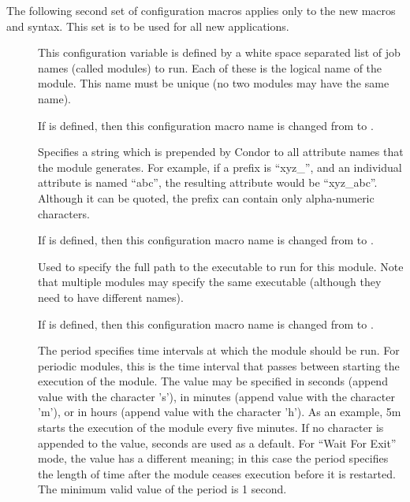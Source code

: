 The following 
second set of configuration macros applies only to the new
macros and syntax.
This set is to be used for all new applications.
\begin{description}

\item[]
\label{param:StartdCronJobList}
  This configuration variable is defined by a white space separated
  list of job names (called modules) to run.
  Each of these is the logical name of the module.  This name
  must be unique (no two modules may have the same name).

  If 
  is defined, then this configuration macro name is changed from
   to
  .

\item[]
\label{param:StartdCronModulePrefix}
    Specifies a string which is prepended by
    Condor to all attribute names that the module generates.  For
    example, if a prefix is ``xyz\_'', and an individual attribute is
    named ``abc'', the resulting attribute would be ``xyz\_abc''.
    Although it can be quoted, the prefix can contain only
    alpha-numeric characters.

    If 
    is defined, then this configuration macro name is changed from
     to
    .

\item[]
\label{param:StartdCronModuleExecutable}
    Used to specify the full path to the
    executable to run for this module.  Note that multiple modules may
    specify the same executable (although they need to have different
    names).

    If 
    is defined, then this configuration macro name is changed from
     to
    .

\item[]
\label{param:StartdCronModulePeriod}
    The period specifies time intervals at
    which the module should be run.
    For periodic modules, this
    is the time interval that passes between starting the execution
    of the module.
    The value may be specified in seconds (append value with the
    character 's'), in minutes (append value with the character 'm'),
    or in hours (append value with the character 'h').
    As an example, 5m starts the execution of the module every five minutes.
    If no character is appended to the value, seconds are used as a default.
    For ``Wait For Exit'' mode, the value has a different meaning; in
    this case 
    the period specifies the length of time after the module ceases execution
    before it is restarted.
    The minimum valid value of the period is 1 second.


\end{description}

